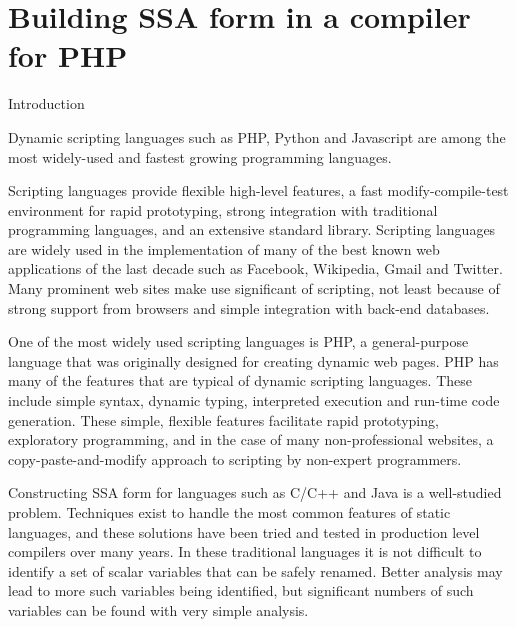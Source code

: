 \chapter{Building SSA form in a compiler for PHP\\ }

\providecommand{\phc}{PHC}
\providecommand{\php}[1]{\textsf{#1}}
\providecommand{\pbterm}[1]{\textsf{#1}}
\providecommand{\chref}[1]{Chapter~#1}
\providecommand{\secref}[1]{Chapter~#1}
\providecommand{\figref}[1]{Figure~#1}
\providecommand{\var}[1]{$\$#1$}
\providecommand{\comnt}[1]

\section{Introduction}

Dynamic scripting languages such as PHP, Python and Javascript are
among the most widely-used and fastest growing programming languages.

Scripting languages provide flexible high-level features, a fast
modify-compile-test environment for rapid prototyping, strong
integration with traditional programming languages, and an extensive
standard library.  Scripting languages are widely used in the
implementation of many of the best known web applications of the last
decade such as Facebook, Wikipedia, Gmail and Twitter.  Many prominent
web sites make use significant of scripting, not least because of
strong support from browsers and simple integration with back-end
databases.

One of the most widely used scripting languages is PHP, a
general-purpose language that was originally designed for creating
dynamic web pages.  PHP has many of the features that are typical of
dynamic scripting languages.  These include simple syntax, dynamic
typing, interpreted execution and run-time code generation.  These
simple, flexible features facilitate rapid prototyping, exploratory
programming, and in the case of many non-professional websites, a
copy-paste-and-modify approach to scripting by non-expert programmers.

Constructing SSA form for languages such as C/C++ and Java is a
well-studied problem. Techniques exist to handle the most common
features of static languages, and these solutions have been tried and
tested in production level compilers over many years.  In these
traditional languages it is not difficult to identify a set of scalar
variables that can be safely renamed.  Better analysis may lead to
more such variables being identified, but significant numbers of such
variables can be found with very simple analysis.

